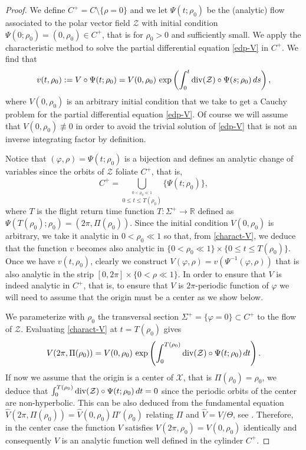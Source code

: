 \documentclass[12pt]{amsart}
\begin{document}
\begin{proof}
We define $C^+ = C \setminus \{\rho=0 \}$ and we let $\Psi(t; \rho_0)$ be the (analytic) flow associated to the polar vector field $\mathcal{Z}$ with initial condition $\Psi(0; \rho_0) = (0, \rho_0) \in C^+$, that is for $\rho_0>0$ and sufficiently small. We apply the characteristic method to solve the partial differential equation \eqref{edp-V} in $C^+$. We find that
\begin{equation}\label{charact-V}
v(t, \rho_0) := V \circ \Psi(t; \rho_0) = V(0, \rho_0) \, \exp\left( \int_0^t {\rm div}(\mathcal{Z}) \circ \Psi(s; \rho_0) \, ds \right),
\end{equation}
where $V(0, \rho_0)$ is an arbitrary initial condition that we take to get a Cauchy problem for the partial differential equation \eqref{edp-V}. Of course we will assume that $V(0, \rho_0) \not\equiv 0$ in order to avoid the trivial solution of \eqref{edp-V} that is not an inverse integrating factor by definition.

Notice that $(\varphi, \rho) = \Psi(t; \rho_0)$ is a bijection and defines an analytic change of variables since the orbits of $\mathcal{Z}$ foliate $C^+$, that is,
$$
C^+ = \bigcup_{\stackrel{0 < \rho_0 \ll 1}{\scriptscriptstyle 0 \leq t \leq T(\rho_0)}} \{  \Psi(t; \rho_0) \},
$$
where $T$ is the flight return time function $T : \Sigma^+ \to \mathbb{R}$ defined as $\Psi(T(\rho_0); \rho_0) = (2 \pi, \Pi(\rho_0))$. Since the initial condition $V(0, \rho_0)$ is arbitrary, we take it analytic in $0 < \rho_0 \ll 1$ so that, from \eqref{charact-V}, we deduce that the function $v$ becomes also analytic in $\{ 0 < \rho_0 \ll 1 \} \times \{ 0 \leq t \leq T(\rho _0) \}$. Once we have $v(t, \rho_0)$, clearly we construct $V(\varphi, \rho) = v(\Psi^{-1}(\varphi, \rho))$ that is also analytic in the strip $[0, 2 \pi] \times \{ 0 < \rho \ll 1 \}$. In order to ensure that $V$ is indeed analytic in $C^+$, that is, to ensure that $V$ is $2 \pi$-periodic function of $\varphi$ we will need to assume that the origin must be a center as we show below.

We parameterize with $\rho_0$ the transversal section $\Sigma^+ = \{ \varphi = 0 \} \subset C^+$ to the flow of $\mathcal{Z}$.  Evaluating \eqref{charact-V} at $t=T(\rho_0)$ gives
$$
V(2 \pi, \Pi(\rho_0)) = V(0, \rho_0) \, \exp\left( \int_0^{T(\rho_0)} {\rm div}(\mathcal{Z}) \circ \Psi(t; \rho_0) \, dt \right).
$$
If now we assume that the origin is a center of $\mathcal{X}$, that is $\Pi(\rho_0)=\rho_0$, we deduce that $\int_0^{T(\rho_0)} {\rm div}(\mathcal{Z}) \circ \Psi(t; \rho_0) \, dt = 0$ since the periodic orbits of the center are non-hyperbolic. This can be also deduced from the fundamental equation $\hat{V}(2 \pi, \Pi(\rho_0)) = \hat{V}(0, \rho_0) \Pi'(\rho_0)$ relating $\Pi$ and $\hat{V} = V/\Theta$, see \cite{GaGi4}. Therefore, in the center case the function $V$ satisfies $V(2 \pi, \rho_0) = V(0, \rho_0)$ identically and consequently $V$ is an analytic function well defined in the cylinder $C^+$.
\newline


\end{proof}
\end{document}

